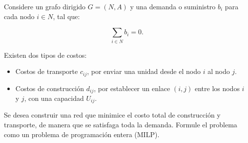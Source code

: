 Considere un grafo dirigido $G = (N, A)$ y una demanda o suministro $b_i$ para cada nodo $i \in N$, tal que: 


\begin{equation}
    \sum_{i \in N} b_i = 0. 
\end{equation}


Existen dos tipos de costos:
\begin{itemize}
    \item Costos de transporte $c_{ij}$, por enviar una unidad desde el nodo $i$ al nodo $j$.
    \item Costos de construcción $d_{ij}$, por establecer un enlace $(i,j)$ entre los nodos $i$ y $j$, con una capacidad $U_{ij}$.
\end{itemize}

Se desea construir una red que minimice el costo total de construcción y transporte, de manera que se satisfaga toda la demanda. Formule el problema como un problema de programación entera (MILP).\\
